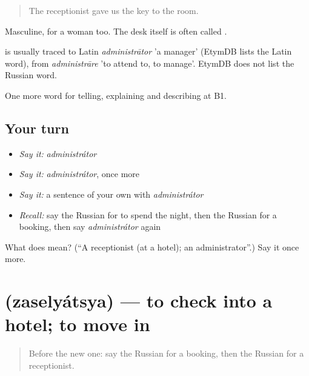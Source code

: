\begin{quote}
The receptionist gave us the key to the room.
\end{quote}

Masculine, for a woman too. The desk itself is often called \emph{}.

\begin{cousinweb}
\emph{} is usually traced to Latin \emph{administrātor} 'a manager' (EtymDB lists the Latin word), from \emph{administrāre} 'to attend to, to manage'. EtymDB does not list the Russian word.
\end{cousinweb}

\begin{grammarlens}[title={What you've built}]
One more word for telling, explaining and describing at B1.
\end{grammarlens}

\subsection*{Your turn}
\begin{itemize}
\raggedright
  \item \emph{Say it:} \emph{administrátor}
  \item \emph{Say it:} \emph{administrátor}, once more
  \item \emph{Say it:} a sentence of your own with \emph{administrátor}
  \item \emph{Recall:} say the Russian for to spend the night, then the Russian for a booking, then say \emph{administrátor} again
\end{itemize}

\begin{tcolorbox}[breakable,colback=teal!4,colframe=teal!35!black,title={Before you move on}]
What does  mean? (\textquotedblleft{}A receptionist (at a hotel); an administrator\textquotedblright{}.) Say it once more.
\end{tcolorbox}
\section[\texorpdfstring{\ru{заселяться} (zaselyátsya)}{заселяться (zaselyátsya)}]{ (zaselyátsya) — to check into a hotel; to move in}

\label{lesson:RU-C429-zaselyatsya}



\begin{quote}
Before the new one: say the Russian for a booking, then the Russian for a receptionist.
\end{quote}

